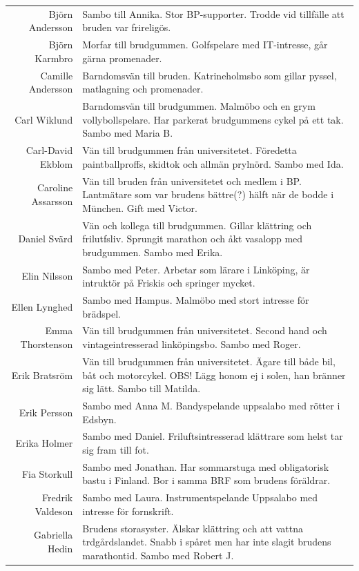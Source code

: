 \documentclass[a5paper]{article}
\begin{document}
\begin{longtable}[l]{N|L}
				Björn Andersson	&	Sambo till Annika. Stor BP-supporter. Trodde vid tillfälle att bruden var frireligös.	\\
				Björn Karmbro	&	Morfar till brudgummen. Golfspelare med IT-intresse, går gärna promenader.  	\\
				Camille Andersson	&	Barndomsvän till bruden. Katrineholmsbo som gillar pyssel, matlagning och promenader.	\\
				Carl Wiklund	&	Barndomsvän till brudgummen. Malmöbo och en grym vollybollspelare. Har parkerat brudgummens cykel på ett tak. Sambo med Maria B.	\\
				Carl-David Ekblom	&	Vän till brudgummen från universitetet. Föredetta paintballproffs, skidtok och allmän prylnörd. Sambo med Ida.	\\
				Caroline Assarsson	&	Vän till bruden från universitetet och medlem i BP. Lantmätare som var brudens bättre(?) hälft när de bodde i München. Gift med Victor.	\\
				Daniel Svärd	&	Vän och kollega till brudgummen. Gillar klättring och frilutfsliv. Sprungit marathon och åkt vasalopp med brudgummen.  Sambo med Erika.	\\
				Elin Nilsson	&	Sambo med Peter. Arbetar som lärare i Linköping, är intruktör på Friskis och springer mycket.	\\
				Ellen Lynghed	&	Sambo med Hampus. Malmöbo med stort intresse för brädspel.	\\
				Emma Thorstenson	&	Vän till brudgummen från universitetet. Second hand och vintageintresserad linköpingsbo. Sambo med Roger.	\\
				Erik Bratsröm	&	Vän till brudgummen från universitetet. Ägare till både bil, båt och motorcykel. OBS! Lägg honom ej i solen, han bränner sig lätt. Sambo till Matilda.	\\
				Erik Persson	&	Sambo med Anna M. Bandyspelande uppsalabo med rötter i Edsbyn. 	\\
				Erika Holmer	&	Sambo med Daniel. Friluftsintresserad klättrare som helst tar sig fram till fot.	\\
				Fia Storkull	&	Sambo med Jonathan.  Har sommarstuga med obligatorisk bastu i Finland. Bor i samma BRF som brudens föräldrar.	\\
				Fredrik Valdeson	&	Sambo med Laura. Instrumentspelande Uppsalabo med intresse för fornskrift.	\\
				Gabriella Hedin	&	Brudens storasyster. Älskar klättring och att vattna trdgårdslandet. Snabb i spåret men har inte slagit brudens marathontid. Sambo med Robert J.	\\

\end{longtable}
\end{document}
